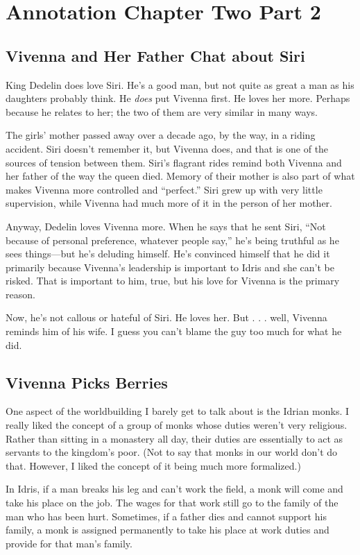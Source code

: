 \section{Annotation Chapter Two Part 2}

\subsection*{Vivenna and Her Father Chat about Siri}

King Dedelin does love Siri. He’s a good man, but not quite as great a man as his daughters probably think. He \textit{does} put Vivenna first. He loves her more. Perhaps because he relates to her; the two of them are very similar in many ways.

The girls’ mother passed away over a decade ago, by the way, in a riding accident. Siri doesn’t remember it, but Vivenna does, and that is one of the sources of tension between them. Siri’s flagrant rides remind both Vivenna and her father of the way the queen died. Memory of their mother is also part of what makes Vivenna more controlled and “perfect.” Siri grew up with very little supervision, while Vivenna had much more of it in the person of her mother.

Anyway, Dedelin loves Vivenna more. When he says that he sent Siri, “Not because of personal preference, whatever people say,” he’s being truthful as he sees things—but he’s deluding himself. He’s convinced himself that he did it primarily because Vivenna’s leadership is important to Idris and she can’t be risked. That is important to him, true, but his love for Vivenna is the primary reason.

Now, he’s not callous or hateful of Siri. He loves her. But . . . well, Vivenna reminds him of his wife. I guess you can’t blame the guy too much for what he did.

\subsection*{Vivenna Picks Berries}

One aspect of the worldbuilding I barely get to talk about is the Idrian monks. I really liked the concept of a group of monks whose duties weren’t very religious. Rather than sitting in a monastery all day, their duties are essentially to act as servants to the kingdom’s poor. (Not to say that monks in our world don’t do that. However, I liked the concept of it being much more formalized.)

In Idris, if a man breaks his leg and can’t work the field, a monk will come and take his place on the job. The wages for that work still go to the family of the man who has been hurt. Sometimes, if a father dies and cannot support his family, a monk is assigned permanently to take his place at work duties and provide for that man’s family.

